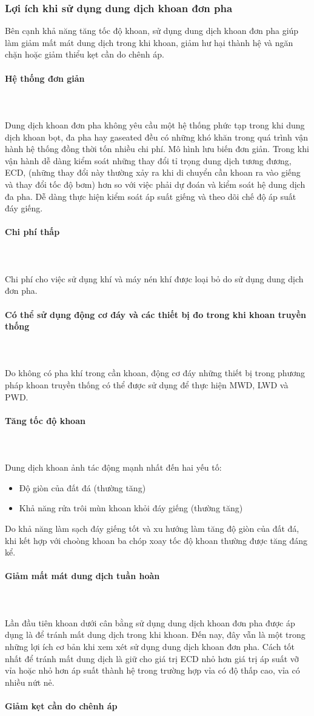 \documentclass[12pt,a4paper]{article}
\newcommand{\subsubsubsection}[1]{\paragraph{#1}\mbox{}\\}
\begin{document}
	\subsubsection{Lợi ích khi sử dụng dung dịch khoan đơn pha}
	Bên cạnh khả năng tăng tốc độ khoan, sử dụng dung dịch khoan đơn pha giúp làm giảm mất mát dung dịch trong khi khoan, giảm hư hại thành hệ và ngăn chặn hoặc giảm thiểu kẹt cần do chênh áp.
		\subsubsubsection{Hệ thống đơn giản}\\
		Dung dịch khoan đơn pha không yêu cầu một hệ thống phức tạp trong khi dung dịch khoan bọt, đa pha hay gaseated đều có những khó khăn trong quá trình vận hành hệ thống đồng thời tốn nhiều chi phí. Mô hình lưu biến đơn giản. Trong khi vận hành dễ dàng kiểm soát những thay đổi tỉ trọng dung dịch tương đương, ECD, (những thay đổi này thường xảy ra khi di chuyển cần khoan ra vào giếng và thay đổi tốc độ bơm) hơn so với việc phải dự đoán và kiểm soát hệ dung dịch đa pha. Dễ dàng thực hiện kiểm soát áp suất giếng và theo dõi chế độ áp suất đáy giếng.
		\subsubsubsection{Chi phí thấp}\\
		Chi phí cho việc sử dụng khí và máy nén khí được loại bỏ do sử dụng dung dịch đơn pha.
		\subsubsubsection{Có thể sử dụng động cơ đáy và các thiết bị đo trong khi  khoan truyền thống} \\
		Do không có pha khí trong cần khoan, động cơ đáy những thiết bị trong phương pháp khoan truyền thống có thể được sử dụng để thực hiện MWD, LWD và PWD.
		\subsubsubsection{Tăng tốc độ khoan}\\
		Dung dịch khoan ảnh tác động mạnh nhất đến hai yếu tố:
		\begin{itemize}
			\item Độ giòn của đất đá (thường tăng)
			\item Khả năng rửa trôi mùn khoan khỏi đáy giếng (thường tăng)
		\end{itemize}
		Do khả năng làm sạch đáy giếng tốt và xu hướng làm tăng độ giòn của đất đá, khi kết hợp với choòng khoan ba chóp xoay tốc độ khoan thường được tăng đáng kể. 
		\subsubsubsection{Giảm mất mát dung dịch tuần hoàn}\\
		Lần đầu tiên khoan dưới cân bằng sử dụng dung dịch khoan đơn pha được áp dụng là để tránh mất dung dịch trong khi khoan. Đến nay, đây vẫn là một trong những lợi ích cơ bản khi xem xét sử dụng dung dịch khoan đơn pha. Cách tốt nhất để tránh mất dung dịch là giữ cho giá trị ECD nhỏ hơn giá trị áp suất vỡ vỉa hoặc nhỏ hơn áp suất thành hệ trong trường hợp vỉa có độ thấp cao, vỉa có nhiều nứt nẻ. 
		\subsubsubsection{Giảm kẹt cần do chênh áp}\\
\end{document}
